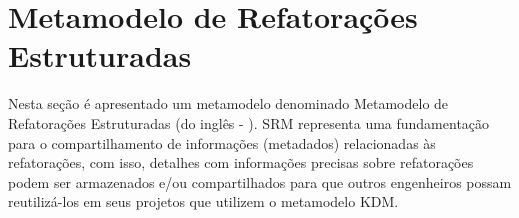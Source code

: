 
\section{Metamodelo de Refatorações Estruturadas} %
\label{sec:meta_modelo_de_refatora_es_estruturadas_srm_do_ingl_s_structured refactoring meta-model_}


Nesta seção é apresentado um metamodelo denominado Metamodelo de Refatorações Estruturadas (do inglês - ). SRM representa uma fundamentação para o compartilhamento de informações (metadados) relacionadas às refatorações, com isso, detalhes com informações precisas sobre refatorações podem ser armazenados e/ou compartilhados para que outros engenheiros possam reutilizá-los em seus projetos que utilizem o metamodelo KDM.


